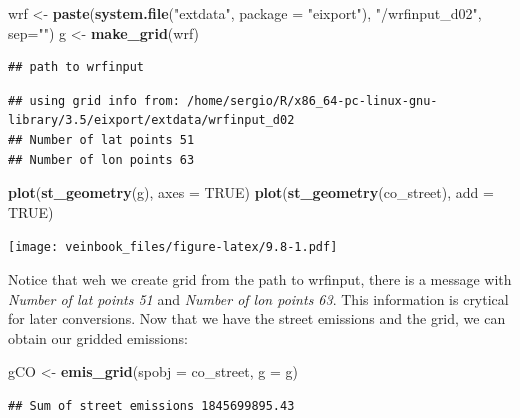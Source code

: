 \documentclass[12pt,graybox,envcountchap,sectrefs]{krantz}
\makeatletter
\newenvironment{Shaded}{\begin{snugshade}}{\end{snugshade}}
\newcommand{\KeywordTok}[1]{\textcolor[rgb]{0.13,0.29,0.53}{\textbf{#1}}}
\newcommand{\DataTypeTok}[1]{\textcolor[rgb]{0.13,0.29,0.53}{#1}}
\newcommand{\StringTok}[1]{\textcolor[rgb]{0.31,0.60,0.02}{#1}}
\newcommand{\OtherTok}[1]{\textcolor[rgb]{0.56,0.35,0.01}{#1}}
\newcommand{\NormalTok}[1]{#1}
\newenvironment{kframe}{%
\medskip{}
\setlength{\fboxsep}{.8em}
 \def\at@end@of@kframe{}%
 \ifinner\ifhmode%
  \def\at@end@of@kframe{\end{minipage}}%
  \begin{minipage}{\columnwidth}%
 \fi\fi%
 \def\FrameCommand##1{\hskip\@totalleftmargin \hskip-\fboxsep
 \colorbox{shadecolor}{##1}\hskip-\fboxsep
     \hskip-\linewidth \hskip-\@totalleftmargin \hskip\columnwidth}%
 \MakeFramed {\advance\hsize-\width
   \@totalleftmargin\z@ \linewidth\hsize
   \@setminipage}}%
 {\par\unskip\endMakeFramed%
 \at@end@of@kframe}
\renewenvironment{Shaded}{\begin{kframe}}{\end{kframe}}
\theoremstyle{definition}
\theoremstyle{definition}
\theoremstyle{definition}
\theoremstyle{remark}
\makeatother
\begin{document}
\begin{Shaded}
\begin{Highlighting}[]
\NormalTok{wrf <-}\StringTok{ }\KeywordTok{paste}\NormalTok{(}\KeywordTok{system.file}\NormalTok{(}\StringTok{"extdata"}\NormalTok{, }\DataTypeTok{package =} \StringTok{"eixport"}\NormalTok{),}
             \StringTok{"/wrfinput_d02"}\NormalTok{, }\DataTypeTok{sep=}\StringTok{""}\NormalTok{)}
\NormalTok{g  <-}\StringTok{ }\KeywordTok{make_grid}\NormalTok{(wrf)}
\end{Highlighting}
\end{Shaded}

\begin{verbatim}
## path to wrfinput
\end{verbatim}

\begin{verbatim}
## using grid info from: /home/sergio/R/x86_64-pc-linux-gnu-library/3.5/eixport/extdata/wrfinput_d02 
## Number of lat points 51
## Number of lon points 63
\end{verbatim}

\begin{Shaded}
\begin{Highlighting}[]
\KeywordTok{plot}\NormalTok{(}\KeywordTok{st_geometry}\NormalTok{(g), }\DataTypeTok{axes =} \OtherTok{TRUE}\NormalTok{)}
\KeywordTok{plot}\NormalTok{(}\KeywordTok{st_geometry}\NormalTok{(co_street), }\DataTypeTok{add =} \OtherTok{TRUE}\NormalTok{)}
\end{Highlighting}
\end{Shaded}

\texttt{[image: veinbook\_files/figure-latex/9.8-1.pdf]}

Notice that weh we create grid from the path to wrfinput, there is a
message with \emph{Number of lat points 51} and \emph{Number of lon
points 63}. This information is crytical for later conversions. Now that
we have the street emissions and the grid, we can obtain our gridded
emissions:

\begin{Shaded}
\begin{Highlighting}[]
\NormalTok{gCO <-}\StringTok{ }\KeywordTok{emis_grid}\NormalTok{(}\DataTypeTok{spobj =}\NormalTok{ co_street, }\DataTypeTok{g =}\NormalTok{ g)}
\end{Highlighting}
\end{Shaded}

\begin{verbatim}
## Sum of street emissions 1845699895.43
\end{verbatim}
\end{document}
